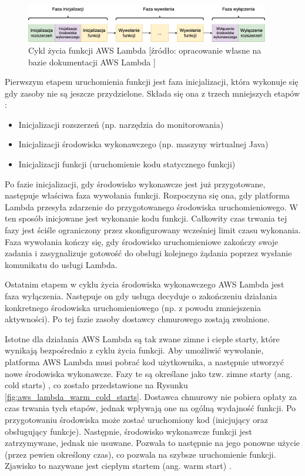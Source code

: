 \begin{figure}[h]
    \centering
    \includegraphics[width=0.95\textwidth]{charts/aws_lambda_lifecycle.drawio.png}
    \caption{Cykl życia funkcji AWS Lambda [źródło: opracowanie własne na bazie dokumentacji AWS Lambda \cite{awsLambdaDocs}]}
    \label{fig:aws_lambda_lifecycle}    
\end{figure}

Pierwszym etapem uruchomienia funkcji jest faza inicjalizacji, która wykonuje się gdy zasoby nie są jeszcze przydzielone.
Składa się ona z trzech mniejszych etapów \cite{awsLambdaDocs}: 
\begin{itemize}
    \item Inicjalizacji rozszerzeń (np. narzędzia do monitorowania)
    \item Inicjalizacji środowiska wykonawczego (np. maszyny wirtualnej Java)
    \item Inicjalizacji funkcji (uruchomienie kodu statycznego funkcji)
\end{itemize}

Po fazie inicjalizacji, gdy środowisko wykonawcze jest już przygotowane, następuje właściwa faza wywołania funkcji.
Rozpoczyna się ona, gdy platforma Lambda przesyła zdarzenie do przygotowanego środowiska uruchomieniowego.
W ten sposób inicjowane jest wykonanie kodu funkcji. 
Całkowity czas trwania tej fazy jest ściśle ograniczony przez skonfigurowany wcześniej limit czasu wykonania. 
Faza wywołania kończy się, gdy środowisko uruchomieniowe zakończy swoje zadania i zasygnalizuje gotowość do obsługi kolejnego żądania poprzez wysłanie komunikatu do usługi Lambda.

Ostatnim etapem w cyklu życia środowiska wykonawczego AWS Lambda jest faza wyłączenia.
Następuje on gdy usługa decyduje o zakończeniu działania konkretnego środowiska uruchomieniowego (np. z powodu zmniejszenia aktywności).
Po tej fazie zasoby dostawcy chmurowego zostają zwolnione.

Istotne dla działania AWS Lambda są tak zwane zimne i ciepłe starty, które wynikają bezpośrednio z cyklu życia funkcji.
Aby umożliwić wywołanie, platforma AWS Lambda musi pobrać kod użytkownika, a następnie utworzyć nowe środowiska wykonawcze.
Fazy te są określane jako tzw. zimne starty (ang. cold starts) \cite{awsLambdaDocs}, co zostało przedstawione na Rysunku \ref{fig:aws_lambda_warm_cold_starts}.
Dostawca chmurowy nie pobiera opłaty za czas trwania tych etapów, jednak wpływają one na ogólną wydajność funkcji.
Po przygotowaniu środowiska może zostać uruchomiony kod (inicjujący oraz obsługujący funkcje).
Następnie, środowisko wykonawcze funkcji jest zatrzymywane, jednak nie usuwane.
Pozwala to następnie na jego ponowne użycie (przez pewien określony czas), co pozwala na szybsze uruchomienie funkcji.
Zjawisko to nazywane jest ciepłym startem (ang. warm start) \cite{awsLambdaDocs}.

